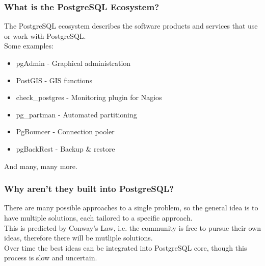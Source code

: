 \begin{frame}
    \frametitle{What is the PostgreSQL Ecosystem?}

    The PostgreSQL ecosystem describes the software products and services that use or work with PostgreSQL.\pause \\
    \vspace{1em}
    Some examples:
    \vspace{1em}
    \begin{itemize}
        \item pgAdmin - Graphical administration\pause
        \item PostGIS - GIS functions\pause
        \item check\_postgres - Monitoring plugin for Nagios\pause
        \item pg\_partman - Automated partitioning\pause
        \item PgBouncer - Connection pooler\pause
        \item pgBackRest - Backup \& restore\pause
    \end{itemize}
    \vspace{1em}
    And many, many more.
\end{frame}

\begin{frame}
    \frametitle{Why aren't they built into PostgreSQL?}

    There are many possible approaches to a single problem, so the general idea is to have multiple solutions, each tailored to a specific approach. \\
    \vspace{1em}
    This is predicted by Conway's Law, i.e. the community is free to pursue their own ideas, therefore there will be mutliple solutions. \\
    \vspace{1em}
    Over time the best ideas can be integrated into PostgreSQL core, though this process is slow and uncertain.

\end{frame}

